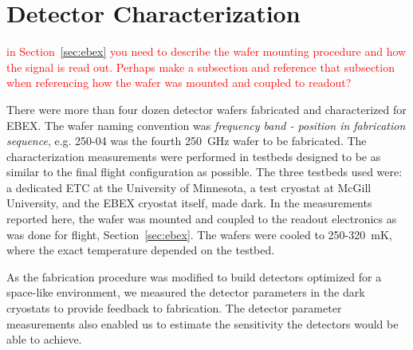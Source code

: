 \chapter{Detector Characterization}
\label{sec:detector_characterization}


\textcolor{red}{in Section~\ref{sec:ebex} you need to describe the wafer mounting procedure and how the signal is read out. Perhaps make a subsection and reference that subsection when referencing how the wafer was mounted and coupled to readout?}

There were more than four dozen detector wafers fabricated and characterized for \ac{EBEX}. 
The wafer naming convention was \textit{frequency band - position in fabrication sequence}, e.g. 250-04 was the fourth 250~GHz wafer to be fabricated.
The characterization measurements were performed in testbeds designed to be as similar to the final flight configuration as possible. 
The three testbeds used were: 
a dedicated \ac{ETC}  at the University of Minnesota, %
a test cryostat at McGill University, and the \ac{EBEX} cryostat itself, made dark. 
In the measurements reported here, the wafer was mounted and coupled to the readout electronics as was done for flight, Section~\ref{sec:ebex}. 
The wafers were cooled to 250-320~mK, where the exact temperature depended on the testbed. 

As the fabrication procedure was modified to build detectors optimized for a space-like environment, we measured the detector parameters in the dark cryostats to provide feedback to fabrication. 
The detector parameter measurements also enabled us to estimate the sensitivity the detectors would be able to achieve. 

